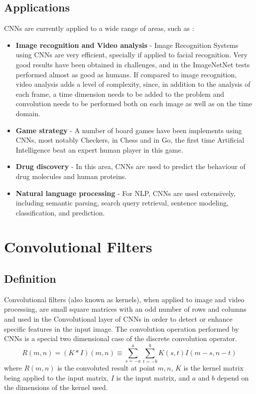 \subsection{Applications}
\label{sec:convolution:convolutionalneuralnetworks:applications}
CNNs are currently applied to a wide range of areas, such as  \citep{Schmidhuber2015}:
\begin{itemize}
    \item \textbf{Image recognition and Video analysis} - Image Recognition Systems using CNNs are very efficient, specially if applied to facial recognition. Very good results have been obtained in challenges, and in the ImageNetNet tests performed almost as good as humans. If compared to image recognition, video analysis adds a level of complexity, since, in addition to the analysis of each frame, a time dimension needs to be added to the problem and convolution needs to be performed both on each image as well as on the time domain.
    \item \textbf{Game strategy} - A number of board games have been implements using CNNs, most notably Checkers, in Chess and in Go, the first time Artificial Intelligence beat an expert human player in this game.
    \item \textbf{Drug discovery} - In this area, CNNs are used to predict the behaviour of drug molecules and human proteins.
    \item \textbf{Natural language processing} - For NLP, CNNs are used extensively, including semantic parsing, search query retrieval, sentence modeling, classification, and prediction.
\end{itemize}
\clearpage
{}
\section{Convolutional Filters}
\label{sec:convolution:convolutionalfilters}
\subsection{Definition}
\label{sec:convolution:convolutionalfilters:definition}
Convolutional filters (also known as kernels), when applied to image and video processing, are small square matrices with an odd number of rows and columns and used in the Convolutional layer of CNNs in order to detect or enhance specific features in the input image.\newline
The convolution operation performed by CNNs is a special two dimensional case of the discrete convolution operator.
\begin{equation}
R(m,n) = (K * I)(m,n)\equiv\sum_{s=-a}^{a}\sum_{t=-b}^{b}K(s,t)I(m-s,n-t)
\end{equation}
where $R(m,n)$ is the convoluted result at point $m,n$, $K$ is the kernel matrix being applied to the input matrix, $I$ is the input matrix, and $a$ and $b$ depend on the dimensions of the kernel used.

